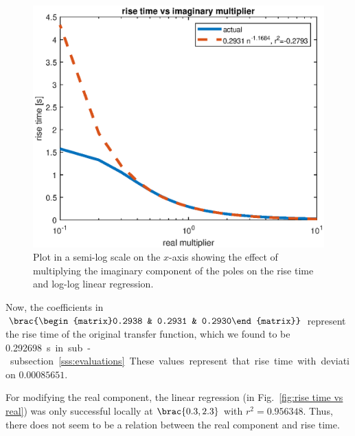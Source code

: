 \documentclass[12pt]{article}
\DeclarePairedDelimiter\brac[]%
\begin{document}
\begin{figure}
    \centering
    \includegraphics[width=\linewidth]{img/part01_rise_time_vs_imag.eps}
    \caption{Plot in a semi-log scale on the $x$-axis
    showing the effect of multiplying the imaginary component of the poles on the rise time and log-log linear regression.}
    \label{fig:rise time vs imag}
\end{figure}

Now, the coefficients in $\brac{\begin{matrix}0.2938 & 0.2931 & 0.2930\end{matrix}}$ represent the rise time of the original transfer function,
which we found to be \SI{0.292698}\second in sub-subsection~\ref{sss:evaluations}.
These values represent that rise time with deviation $\num{0.00085651}$.

For modifying the real component, the linear regression
(in Fig.~\ref{fig:rise time vs real})
was only successful locally at $\brac{0.3, 2.3}$ with $r^2 = \num{0.956348}$.
Thus, there does not seem to be a relation between the real component and rise time.
\end{document}

